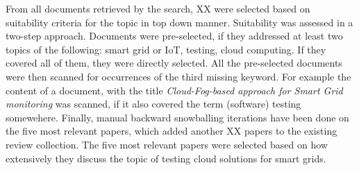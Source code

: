 From all documents retrieved by the search, XX were selected based on suitability criteria for the topic in top down manner. Suitability was assessed in a two-step approach. Documents were pre-selected, if they addressed at least two topics of the following: smart grid or IoT, testing, cloud computing. If they covered all of them, they were directly selected. All the pre-selected documents were then scanned for occurrences of the third missing keyword. For example the content of a document, with the title \textit{Cloud-Fog-based approach for Smart Grid monitoring} was scanned, if it also covered the term (software) testing somewehere. Finally, manual backward snowballing iterations have been done on the five most relevant papers, which added another XX papers to the existing review collection. The five most relevant papers were selected based on how extensively they discuss the topic of testing cloud solutions for smart grids.

